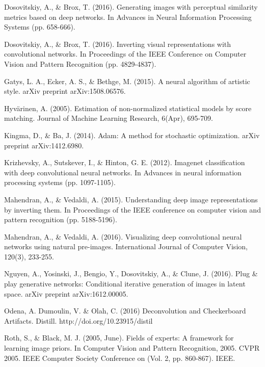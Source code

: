 \documentclass{article}
\begin{document}
\begin{thebibliography}{9}



 Dosovitskiy, A., \& Brox, T. (2016). Generating images with perceptual similarity metrics based on deep networks. In Advances in Neural Information Processing Systems (pp. 658-666).

 Dosovitskiy, A., \& Brox, T. (2016). Inverting visual representations with convolutional networks. In Proceedings of the IEEE Conference on Computer Vision and Pattern Recognition (pp. 4829-4837).

 Gatys, L. A., Ecker, A. S., \& Bethge, M. (2015). A neural algorithm of artistic style. arXiv preprint arXiv:1508.06576.

 Hyvärinen, A. (2005). Estimation of non-normalized statistical models by score matching. Journal of Machine Learning Research, 6(Apr), 695-709.

 Kingma, D., \& Ba, J. (2014). Adam: A method for stochastic optimization. arXiv preprint arXiv:1412.6980.

 Krizhevsky, A., Sutskever, I., \& Hinton, G. E. (2012). Imagenet classification with deep convolutional neural networks. In Advances in neural information processing systems (pp. 1097-1105).

 Mahendran, A., \& Vedaldi, A. (2015). Understanding deep image representations by inverting them. In Proceedings of the IEEE conference on computer vision and pattern recognition (pp. 5188-5196).

 Mahendran, A., \& Vedaldi, A. (2016). Visualizing deep convolutional neural networks using natural pre-images. International Journal of Computer Vision, 120(3), 233-255.

 Nguyen, A., Yosinski, J., Bengio, Y., Dosovitskiy, A., \& Clune, J. (2016). Plug \& play generative networks: Conditional iterative generation of images in latent space. arXiv preprint arXiv:1612.00005.

 Odena, A. Dumoulin, V. \& Olah, C. (2016) Deconvolution and Checkerboard Artifacts. Distill. http://doi.org/10.23915/distil

 Roth, S., \& Black, M. J. (2005, June). Fields of experts: A framework for learning image priors. In Computer Vision and Pattern Recognition, 2005. CVPR 2005. IEEE Computer Society Conference on (Vol. 2, pp. 860-867). IEEE.


\end{thebibliography}
\end{document}
